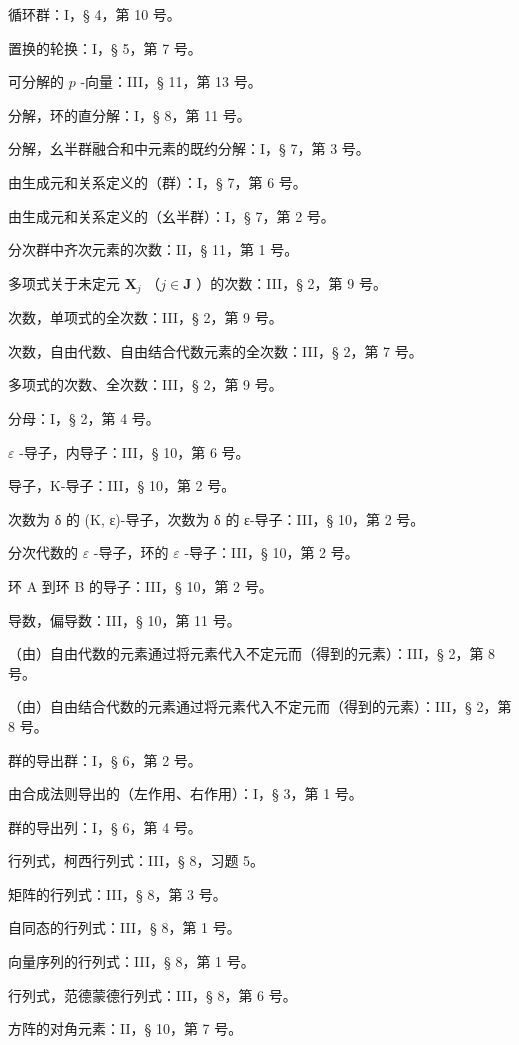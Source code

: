 循环群：I，§ 4，第 10 号。

置换的轮换：I，§ 5，第 7 号。

可分解的 \(p\) -向量：III，§ 11，第 13 号。

分解，环的直分解：I，§ 8，第 11 号。

分解，幺半群融合和中元素的既约分解：I，§ 7，第 3 号。

由生成元和关系定义的（群）：I，§ 7，第 6 号。

由生成元和关系定义的（幺半群）：I，§ 7，第 2 号。

分次群中齐次元素的次数：II，§ 11，第 1 号。

多项式关于未定元 \(\mathbf{X}_j\) （\(j\in \mathbf{J}\) ）的次数：III，§ 2，第 9 号。

次数，单项式的全次数：III，§ 2，第 9 号。

次数，自由代数、自由结合代数元素的全次数：III，§ 2，第 7 号。

多项式的次数、全次数：III，§ 2，第 9 号。

分母：I，§ 2，第 4 号。

\(\varepsilon\) -导子，内导子：III，§ 10，第 6 号。

导子，K-导子：III，§ 10，第 2 号。

次数为 δ 的 (K, ε)-导子，次数为 δ 的 ε-导子：III，§ 10，第 2 号。

分次代数的 \(\varepsilon\) -导子，环的 \(\varepsilon\) -导子：III，§ 10，第 2 号。

环 A 到环 B 的导子：III，§ 10，第 2 号。

导数，偏导数：III，§ 10，第 11 号。

（由）自由代数的元素通过将元素代入不定元而（得到的元素）：III，§ 2，第 8 号。

（由）自由结合代数的元素通过将元素代入不定元而（得到的元素）：III，§ 2，第 8 号。

群的导出群：I，§ 6，第 2 号。

由合成法则导出的（左作用、右作用）：I，§ 3，第 1 号。

群的导出列：I，§ 6，第 4 号。

行列式，柯西行列式：III，§ 8，习题 5。

矩阵的行列式：III，§ 8，第 3 号。

自同态的行列式：III，§ 8，第 1 号。

向量序列的行列式：III，§ 8，第 1 号。

行列式，范德蒙德行列式：III，§ 8，第 6 号。

方阵的对角元素：II，§ 10，第 7 号。

